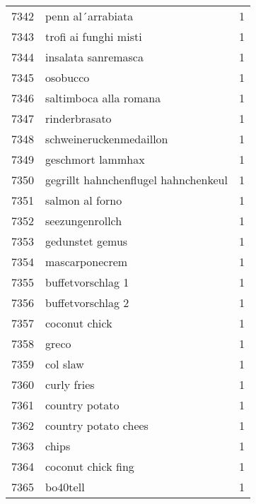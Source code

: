 \begin{tabular}{llr}
7342 &                                  penn al´arrabiata &      1 \\
7343 &                              trofi ai funghi misti &      1 \\
7344 &                                insalata sanremasca &      1 \\
7345 &                                           osobucco &      1 \\
7346 &                             saltimboca alla romana &      1 \\
7347 &                                      rinderbrasato &      1 \\
7348 &                            schweineruckenmedaillon &      1 \\
7349 &                                  geschmort lammhax &      1 \\
7350 &               gegrillt hahnchenflugel hahnchenkeul &      1 \\
7351 &                                    salmon al forno &      1 \\
7352 &                                    seezungenrollch &      1 \\
7353 &                                    gedunstet gemus &      1 \\
7354 &                                     mascarponecrem &      1 \\
7355 &                                  buffetvorschlag 1 &      1 \\
7356 &                                  buffetvorschlag 2 &      1 \\
7357 &                                      coconut chick &      1 \\
7358 &                                              greco &      1 \\
7359 &                                           col slaw &      1 \\
7360 &                                        curly fries &      1 \\
7361 &                                     country potato &      1 \\
7362 &                               country potato chees &      1 \\
7363 &                                              chips &      1 \\
7364 &                                 coconut chick fing &      1 \\
7365 &                                           bo40tell &      1 \\

\end{tabular}
